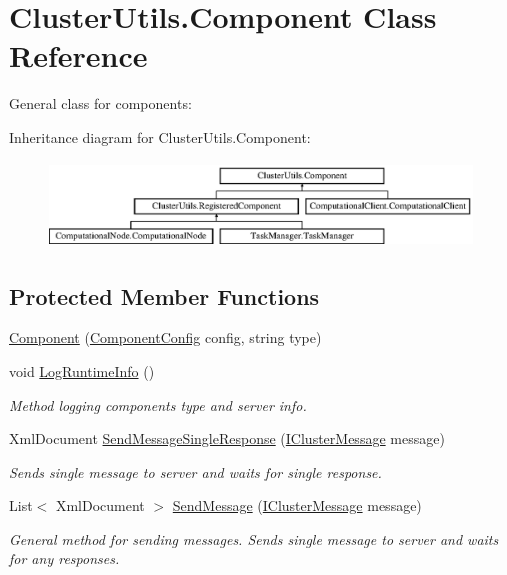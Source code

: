 \hypertarget{class_cluster_utils_1_1_component}{}\section{Cluster\+Utils.\+Component Class Reference}
\label{class_cluster_utils_1_1_component}


General class for components\+:  


Inheritance diagram for Cluster\+Utils.\+Component\+:\begin{figure}[H]
\begin{center}
\leavevmode
\includegraphics[height=2.276423cm]{class_cluster_utils_1_1_component}
\end{center}
\end{figure}
\subsection*{Protected Member Functions}
\begin{DoxyCompactItemize}
\item 
\hyperlink{class_cluster_utils_1_1_component_aa9235e09af855b4d29259ca086a1432f}{Component} (\hyperlink{class_cluster_utils_1_1_component_config}{Component\+Config} config, string type)
\item 
void \hyperlink{class_cluster_utils_1_1_component_a55dbb672ff63763256586cf481762dcb}{Log\+Runtime\+Info} ()
\begin{DoxyCompactList}\small\item\em Method logging components type and server info. \end{DoxyCompactList}\item 
Xml\+Document \hyperlink{class_cluster_utils_1_1_component_affb25647a4c013dee3ab2b6f82239238}{Send\+Message\+Single\+Response} (\hyperlink{interface_cluster_messages_1_1_i_cluster_message}{I\+Cluster\+Message} message)
\begin{DoxyCompactList}\small\item\em Sends single message to server and waits for single response. \end{DoxyCompactList}\item 
List$<$ Xml\+Document $>$ \hyperlink{class_cluster_utils_1_1_component_a559397a5cfeeb494a19da1bdd02f8ac0}{Send\+Message} (\hyperlink{interface_cluster_messages_1_1_i_cluster_message}{I\+Cluster\+Message} message)
\begin{DoxyCompactList}\small\item\em General method for sending messages. Sends single message to server and waits for any responses. \end{DoxyCompactList}\end{DoxyCompactItemize}
